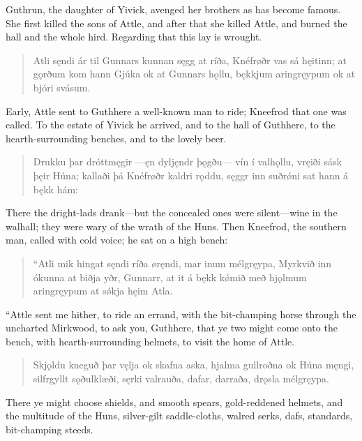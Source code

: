 \bookStart

Guthrun, the daughter of Yivick, avenged her brothers as has become famous. She first killed the sons of Attle, and after that she killed Attle, and burned the hall and the whole hird. Regarding that this lay is wrought.

\begin{verse}
\bva Atli sęndi \hld ár til Gunnars
kunnan sęgg at ríða, \hld Knéfrøðr vas sá hęitinn;
at gǫrðum kom hann Gjúka \hld ok at Gunnars hǫllu,
bękkjum aringręypum \hld ok at bjóri svásum. 
\end{verse}

\bvb Early, Attle sent to Guthhere a well-known man to ride; Kneefrod that one was called. To the estate of Yivick he arrived, and to the hall of Guthhere, to the hearth-surrounding benches, and to the lovely beer.

\begin{verse}
\bva Drukku þar dróttmęgir \hld —ęn dyljęndr þǫgðu—
vín í valhǫllu, \hld vręiði sásk þęir Húna;
kallaði þá Knéfrøðr \hld kaldri rǫddu,
sęggr inn suðrǿni \hld sat hann á bękk hám: 
\end{verse}

\bvb There the dright-lads drank—but the concealed ones were silent—wine in the walhall; they were wary of the wrath of the Huns. Then Kneefrod, the southern man, called with cold voice; he sat on a high bench:

\begin{verse}
\bva “Atli mik hingat sęndi \hld ríða øręndi,
mar inum mélgręypa, \hld Myrkvið inn ókunna
at biðja yðr, Gunnarr, \hld at it á bękk kǿmið
með hjǫlmum aringręypum \hld at sǿkja hęim Atla. 
\end{verse}

\bvb “Attle sent me hither, to ride an errand, with the bit-champing horse through the uncharted Mirkwood, to ask you, Guthhere, that ye two might come onto the bench, with hearth-surrounding helmets, to visit the home of Attle.

\begin{verse}
\bva Skjǫldu kneguð þar vęlja \hld ok skafna aska,
hjalma gullroðna \hld ok Húna męngi,
silfrgyllt sǫðulklæði, \hld sęrki valrauða,
dafar, darraða, \hld drǫsla mélgręypa. 
\end{verse}

\bvb There ye might choose shields, and smooth spears, gold-reddened helmets, and the multitude of the Huns, silver-gilt saddle-cloths, walred serks, dafs, standards, bit-champing steeds.

